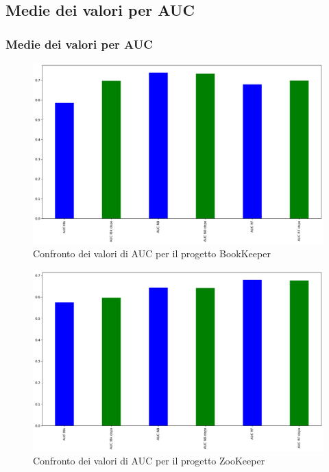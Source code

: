 \documentclass[10pt]{beamer}
\begin{document}
\begin{frame}
\section{Medie dei valori per AUC}
\frametitle{Medie dei valori per AUC}
\begin{minipage}[t]{0.5\textwidth}%
\begin{figure}
\includegraphics[scale=0.18]{images/auc_bar_bk}
\caption{Confronto dei valori di AUC per il progetto BookKeeper}
\end{figure}
\end{minipage}%
\begin{minipage}[t]{0.5\textwidth}
\begin{figure}
\includegraphics[scale=0.18]{images/auc_bar_zk}
\caption{Confronto dei valori di AUC per il progetto ZooKeeper}
\end{figure}
\end{minipage}
\end{frame}
\end{document}
